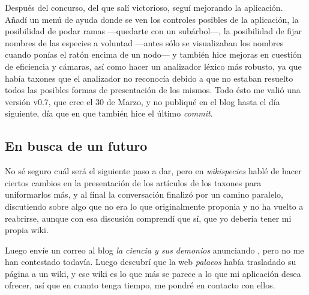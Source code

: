 Después del concurso, del que salí victorioso, seguí mejorando la
aplicación. Añadí un menú de ayuda donde se ven los controles posibles
de la aplicación, la posibilidad de podar ramas \----quedarte con un
subárbol\----, la posibilidad de fijar nombres de las especies a
voluntad \----antes sólo se visualizaban los nombres cuando ponías el
ratón encima de un nodo\---- y también hice mejoras en cuestión de
eficiencia y cámaras, así como hacer un analizador léxico más robusto,
ya que había taxones que el analizador no reconocía debido a que no
estaban resuelto todos las posibles formas de presentación de los
mismos. Todo ésto me valió una versión v0.7, que cree el 30 de Marzo,
y no publiqué en el blog hasta el día siguiente, día que en que
también hice el último \textit{commit}.

\subsection{En busca de un futuro}
No sé seguro cuál será el siguiente paso a dar, pero en
\textit{wikispecies} hablé de hacer ciertos cambios en la presentación
de los artículos de los taxones para uniformarlos más, y al final la conversación
finalizó por un camino paralelo,
discutiendo sobre algo que no era lo que originalmente proponia y no
ha vuelto a reabrirse, aunque con esa discusión comprendí que sí, que
yo debería tener mi propia wiki.

Luego envíe un correo al blog \textit{la ciencia y sus demonios}
anunciando \fpt, pero no me han contestado todavía. Luego descubrí que
la web \textit{palaeos} había trasladado su página a un wiki, y ese
wiki es lo que más se parece a lo que mi aplicación desea ofrecer, así
que en cuanto tenga tiempo, me pondré en contacto con ellos.
